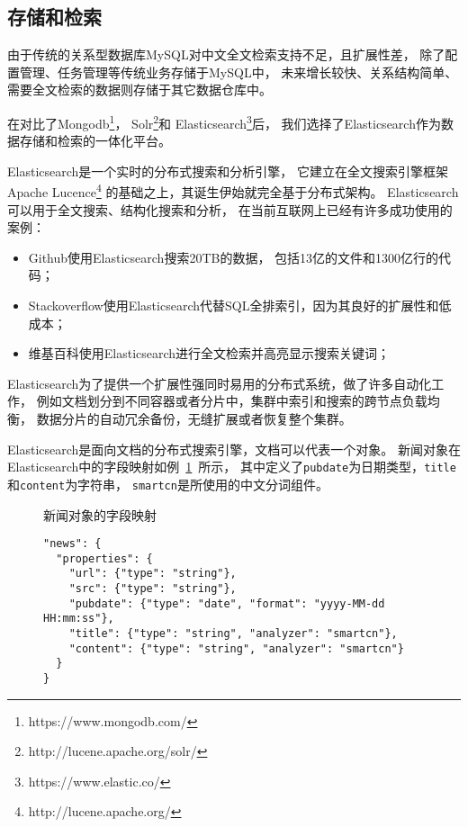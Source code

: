 \subsection{存储和检索}
由于传统的关系型数据库MySQL对中文全文检索支持不足，且扩展性差，
除了配置管理、任务管理等传统业务存储于MySQL中，
未来增长较快、关系结构简单、需要全文检索的数据则存储于其它数据仓库中。

在对比了Mongodb\footnote{https://www.mongodb.com/}，
Solr\footnote{http://lucene.apache.org/solr/}和
Elasticsearch\footnote{https://www.elastic.co/}后，
我们选择了Elasticsearch作为数据存储和检索的一体化平台。

Elasticsearch是一个实时的分布式搜索和分析引擎，
它建立在全文搜索引擎框架Apache Lucence\footnote{http://lucene.apache.org/}
的基础之上，其诞生伊始就完全基于分布式架构。
Elasticsearch可以用于全文搜索、结构化搜索和分析，
在当前互联网上已经有许多成功使用的案例：
\begin{itemize}
\item Github使用Elasticsearch搜索20TB的数据，
包括13亿的文件和1300亿行的代码；
\item Stackoverflow使用Elasticsearch代替SQL全排索引，因为其良好的扩展性和低成本；
\item 维基百科使用Elasticsearch进行全文检索并高亮显示搜索关键词；
\end{itemize}

Elasticsearch为了提供一个扩展性强同时易用的分布式系统，做了许多自动化工作，
例如文档划分到不同容器或者分片中，集群中索引和搜索的跨节点负载均衡，
数据分片的自动冗余备份，无缝扩展或者恢复整个集群。

Elasticsearch是面向文档的分布式搜索引擎，文档可以代表一个对象。
新闻对象在Elasticsearch中的字段映射如例~\ref{ex:news-mapping}~所示，
其中定义了\texttt{pubdate}为日期类型，\texttt{title}和\texttt{content}为字符串，
\texttt{smartcn}是所使用的中文分词组件。

\begin{figure}[t]
\begin{example}
\label{ex:news-mapping}
新闻对象的字段映射
\end{example}
\begin{verbatim}
"news": {
  "properties": {
    "url": {"type": "string"},
    "src": {"type": "string"},
    "pubdate": {"type": "date", "format": "yyyy-MM-dd HH:mm:ss"},
    "title": {"type": "string", "analyzer": "smartcn"},
    "content": {"type": "string", "analyzer": "smartcn"}
  }
}
\end{verbatim}
\end{figure}


